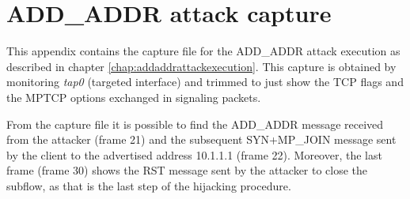 \chapter{ADD\_ADDR attack capture}
\label{app:a}

This appendix contains the capture file for the ADD\_ADDR attack execution as described in chapter \ref{chap:addaddrattackexecution}. This capture is obtained by monitoring \textit{tap0} (targeted interface) and trimmed to just show the TCP flags and the MPTCP options exchanged in signaling packets.

From the capture file it is possible to find the ADD\_ADDR message received from the attacker (frame 21) and the subsequent SYN+MP\_JOIN message sent by the client to the advertised address 10.1.1.1 (frame 22). Moreover, the last frame (frame 30) shows the RST message sent by the attacker to close the subflow, as that is the last step of the hijacking procedure.

